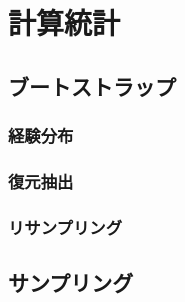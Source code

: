 \chapter{計算統計}
\label{chap:stat-computational}

\begin{chaptergoal}
\end{chaptergoal}

\section{ブートストラップ}
\label{sec:stat-bootstrap}



\subsection{経験分布}

\subsection{復元抽出}

\subsection{リサンプリング}

\section{サンプリング}
\label{sec:stat-sampling}


